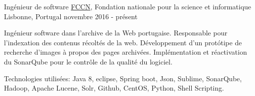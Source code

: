 


\begin{cventries}


\cventry
{Ingénieur de software} %
{\href{https://www.fccn.pt/en/}{FCCN}, Fondation nationale pour la science et informatique} %
{Lisbonne, Portugal} %
{novembre 2016 - présent} %
{ %
\begin{cvitems}
\item {Ingénieur software dans l'archive de la Web portugaise. Responsable pour l’indexation des contenus récoltés de la web. Développement d’un protótipe de recherche d’images à propos des pages archivées. Implémentation et réactivation du SonarQube pour le contrôle de la qualité du logiciel.}
\item {Technologies utilisées: Java 8, eclipse, Spring boot, Json, Sublime, SonarQube, Hadoop, Apache Lucene, Solr, Github, CentOS, Python, Shell Scripting.}
\end{cvitems}
}



\end{cventries}
